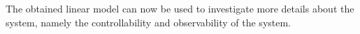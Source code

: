 The obtained linear model can now be used to investigate more details about the system, namely the controllability and observability of the system.






